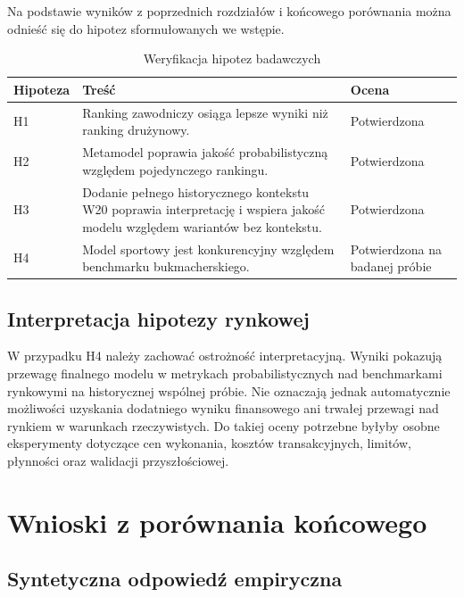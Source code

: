 Na podstawie wyników z poprzednich rozdziałów i końcowego porównania można odnieść się do hipotez
sformułowanych we wstępie.

\begin{table}[H]
    \centering
    \caption{Weryfikacja hipotez badawczych}
    \label{tab:hypotheses_verification}
    \begin{tabular}{p{}p{}p{}}
        \toprule
        Hipoteza & Treść & Ocena \\
        \midrule
        H1 & Ranking zawodniczy osiąga lepsze wyniki niż ranking drużynowy. & Potwierdzona \\
        H2 & Metamodel poprawia jakość probabilistyczną względem pojedynczego rankingu. & Potwierdzona \\
        H3 & Dodanie pełnego historycznego kontekstu W20 poprawia interpretację i wspiera jakość modelu względem wariantów bez kontekstu. & Potwierdzona \\
        H4 & Model sportowy jest konkurencyjny względem benchmarku bukmacherskiego. & Potwierdzona na badanej próbie \\
        \bottomrule
    \end{tabular}
\end{table}

\subsection{Interpretacja hipotezy rynkowej}

W przypadku H4 należy zachować ostrożność interpretacyjną. Wyniki pokazują przewagę finalnego modelu
w metrykach probabilistycznych nad benchmarkami rynkowymi na historycznej wspólnej próbie. Nie
oznaczają jednak automatycznie możliwości uzyskania dodatniego wyniku finansowego ani trwałej
przewagi nad rynkiem w warunkach rzeczywistych. Do takiej oceny potrzebne byłyby osobne eksperymenty
dotyczące cen wykonania, kosztów transakcyjnych, limitów, płynności oraz walidacji przyszłościowej.

\section{Wnioski z porównania końcowego}

\subsection{Syntetyczna odpowiedź empiryczna}

